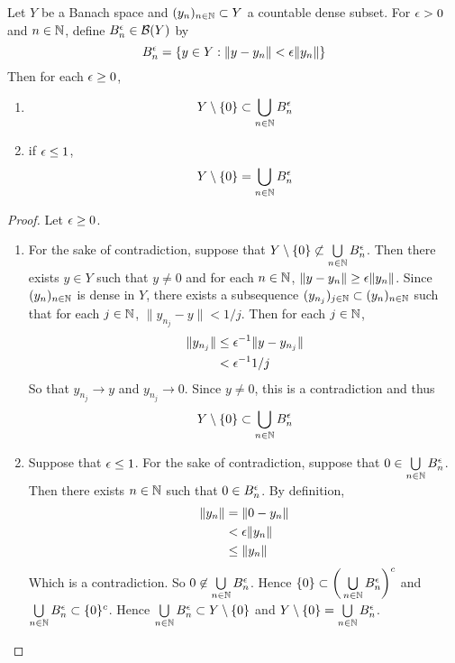 \documentclass{book}
\begin{document}
	\begin{ex}  
	Let $Y$ be a Banach space and $(y_n)_{n \in \mathbb{N}} \subset Y$ a countable dense subset. For $\epsilon >0$ and $n \in \mathbb{N}$, define $B^{\epsilon}_n \in \mathcal{B}(Y)$ by 
	$$B^{\epsilon}_n = \{y \in Y: \|y - y_n\| < \epsilon \| y_n \| \}$$ 
	Then for each $\epsilon \geq 0$, 
	\begin{enumerate}
		\item $$Y \setminus \{ 0 \} \subset \bigcup\limits_{n \in \mathbb{N}}B^{\epsilon}_n$$
		\item if $\epsilon \leq 1$, $$Y \setminus \{ 0 \} = \bigcup\limits_{n \in \mathbb{N}}B^{\epsilon}_n$$
	\end{enumerate}
	\end{ex}	
	
	\begin{proof}
	Let $\epsilon \geq 0$. 
	\begin{enumerate}
		\item For the sake of contradiction, suppose that $Y\setminus \{ 0 \} \not \subset \bigcup\limits_{n \in \mathbb{N}}B^{\epsilon}_n$. Then there exists $y \in Y$ such that $y \neq 0$ and for each $n \in \mathbb{N}$, $\|y- y_n\| \geq \epsilon \|y_n\|$. Since $(y_n)_{n \in \mathbb{N}}$ is dense in $Y$, there exists a subsequence $(y_{n_j})_{j \in \mathbb{N}} \subset (y_n)_{n \in \mathbb{N}}$ such that for each $j \in \mathbb{N}$, $\|y_{n_j} - y\| < 1/j$. Then for each $j \in \mathbb{N}$,
		\begin{align*}
			\|y_{n_j}\| 
			& \leq  \epsilon^{-1}\|y- y_{n_j}\| \\
			& < \epsilon^{-1}1/j
		\end{align*}
		So that $y_{n_j} \rightarrow y$ and $y_{n_j} \rightarrow 0$. Since $y \neq 0$, this is a contradiction and thus $$Y \setminus \{ 0 \} \subset \bigcup\limits_{n \in \mathbb{N}}B^{\epsilon}_n$$ 
		\item Suppose that $\epsilon \leq 1$. For the sake of contradiction, suppose that $0 \in \bigcup\limits_{n \in \mathbb{N}}B^{\epsilon}_n $. Then there exists $n \in \mathbb{N}$ such that $0 \in B^{\epsilon}_n$.  By definition, 
		\begin{align*}
			\|y_n\| 
			& = \|0 - y_n\| \\
			& < \epsilon \|y_n\| \\
			& \leq \|y_n\|
		\end{align*}
		Which is a contradiction. So $0 \not \in  \bigcup\limits_{n \in \mathbb{N}}B^{\epsilon}_n$. Hence $\{0\} \subset \bigg( \bigcup\limits_{n \in \mathbb{N}}B^{\epsilon}_n \bigg)^c$ and $ \bigcup\limits_{n \in \mathbb{N}}B^{\epsilon}_n \subset \{0\}^c$. Hence $ \bigcup\limits_{n \in \mathbb{N}}B^{\epsilon}_n \subset Y \setminus \{0\}$ and $Y \setminus \{ 0 \} = \bigcup\limits_{n \in \mathbb{N}}B^{\epsilon}_n$.
	\end{enumerate}
	\end{proof}
\end{document}
